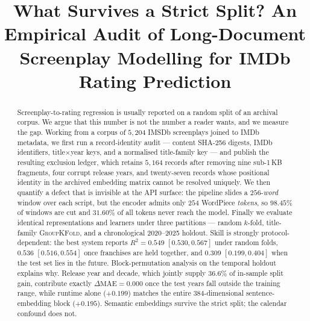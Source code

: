 \documentclass[conference,a4paper]{IEEEtran}
\begin{document}
\title{What Survives a Strict Split? An Empirical Audit of
       Long-Document Screenplay Modelling for IMDb Rating Prediction}

\author{}

\maketitle

\begin{abstract}
Screenplay-to-rating regression is usually reported on a random split of
an archival corpus. We argue that this number is not the number a reader
wants, and we measure the gap. Working from a corpus of $5{,}204$
IMSDb screenplays joined to IMDb metadata, we first run a record-identity
audit --- content SHA-256 digests, IMDb identifiers, title$\times$year
keys, and a normalised title-family key --- and publish the resulting
exclusion ledger, which retains $5{,}164$ records after removing nine
sub-1\,KB fragments, four corrupt release years, and twenty-seven records
whose positional identity in the archived embedding matrix cannot be
resolved uniquely. We then quantify a defect that is invisible at the API
surface: the pipeline slides a $256$-\emph{word} window over each script,
but the encoder admits only $254$ WordPiece \emph{tokens}, so
$98.45\%$ of windows are cut and $31.60\%$ of all tokens never reach the
model. Finally we evaluate identical representations and learners under
three partitions --- random $k$-fold, title-family \textsc{GroupKFold},
and a chronological 2020--2025 holdout. Skill is strongly
protocol-dependent: the best system reports $R^{2}=0.549$
$[0.530, 0.567]$ under random folds, $0.536$ $[0.516, 0.554]$ once
franchises are held together, and $0.309$ $[0.199, 0.404]$ when the test
set lies in the future. Block-permutation analysis on the temporal
holdout explains why. Release year and decade, which jointly supply
$36.6\%$ of in-sample split gain, contribute exactly
$\Delta\mathrm{MAE}=0.000$ once the test years fall outside the training
range, while runtime alone ($+0.199$) matches the entire $384$-dimensional
sentence-embedding block ($+0.195$). Semantic embeddings survive the
strict split; the calendar confound does not.
\end{abstract}
\end{document}

